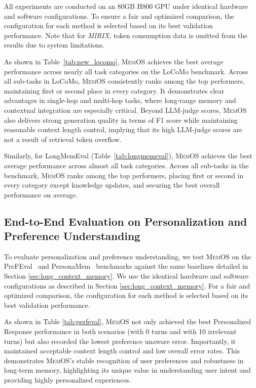 \documentclass[]{memtensor}
\begin{document}
All experiments are conducted on an 80GB H800 GPU under identical hardware and software configurations. To ensure a fair and optimized comparison, the configuration for each method is selected based on its best validation performance. Note that for \textit{MIRIX}, token consumption data is omitted from the results due to system limitations.



As shown in Table~\ref{tab:new_locomo}, \textsc{MemOS} achieves the best average performance across nearly all task categories on the LoCoMo benchmark.
Across all sub-tasks in LoCoMo, \textsc{MemOS} consistently ranks among the top performers, maintaining first or second place in every category. It demonstrates clear advantages in single-hop and multi-hop tasks, where long-range memory and contextual integration are especially critical. Beyond LLM-judge scores, \textsc{MemOS} also delivers strong generation quality in terms of F1 score while maintaining reasonable context length control, implying that its high LLM-judge scores are not a result of retrieval token overflow.



Similarly, for LongMemEval (Table~\ref{tab:longmemeval}), \textsc{MemOS} achieves the best average performance across almost all task categories.
Across all sub-tasks in the benchmark, \textsc{MemOS} ranks among the top performers, placing first or second in every category except knowledge updates, and securing the best overall performance on average.

\subsection{End-to-End Evaluation on Personalization and Preference Understanding}

To evaluate personalization and preference understanding, we test \textsc{MemOS} on the PreFEval~\cite{zhao2025llms} and PersonaMem~\cite{jiang2025know} benchmarks against the same baselines detailed in Section \ref{sec:long_context_memory}. We use the identical hardware and software configurations as described in Section \ref{sec:long_context_memory}. For a fair and optimized comparison, the configuration for each method is selected based on its best validation performance.



As shown in Table \ref{tab:perfeval}, \textsc{MemOS} not only achieved the best Personalized Response performance in both scenarios (with 0 turns and with 10 irrelevant turns) but also recorded the lowest preference unaware error. Importantly, it maintained acceptable context length control and low overall error rates. This demonstrates \textsc{MemOS}'s stable recognition of user preferences and robustness in long-term memory, highlighting its unique value in understanding user intent and providing highly personalized experiences.
\end{document}
